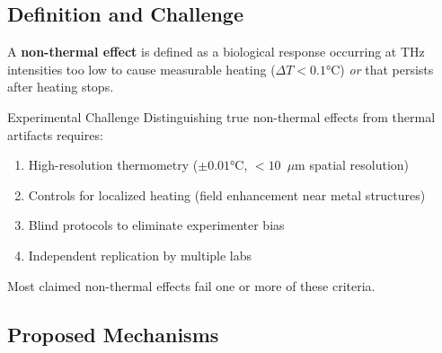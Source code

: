 \begin{center}
\end{center}

\subsection{Definition and Challenge}

A \textbf{non-thermal effect} is defined as a biological response occurring at THz intensities too low to cause measurable heating ($\Delta T < 0.1°$C) \textit{or} that persists after heating stops.

\begin{calloutbox}{Experimental Challenge}
Distinguishing true non-thermal effects from thermal artifacts requires:
\begin{enumerate}
\item High-resolution thermometry ($\pm 0.01°$C, $<10$~$\mu$m spatial resolution)
\item Controls for localized heating (field enhancement near metal structures)
\item Blind protocols to eliminate experimenter bias
\item Independent replication by multiple labs
\end{enumerate}
Most claimed non-thermal effects fail one or more of these criteria.
\end{calloutbox}

\subsection{Proposed Mechanisms}

